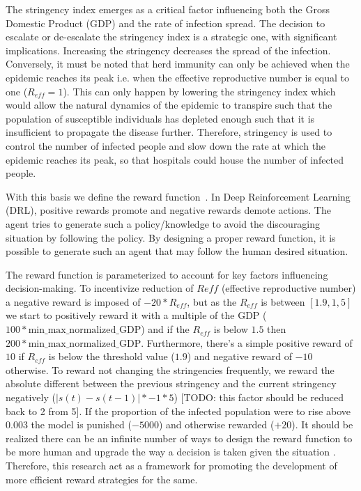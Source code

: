 \documentclass[tikz,fleqn,12pt]{wlscirep}
\begin{document}
The stringency index emerges as a critical factor influencing both the Gross Domestic Product (GDP) and the rate of infection spread. The decision to escalate or de-escalate the stringency index is a strategic one, with significant implications. Increasing the stringency decreases the spread of the infection. Conversely, it must be noted that herd immunity can only be achieved when the epidemic reaches its peak i.e. when the effective reproductive number is equal to one ($R_{eff} = 1$). This can only happen by lowering the stringency index which would allow the natural dynamics of the epidemic to transpire such that the population of susceptible individuals has depleted enough such that it is insufficient to propagate the disease further. Therefore, stringency is used to control the number of infected people and slow down the rate at which the epidemic reaches its peak, so that hospitals could house the number of infected people.

With this basis we define the reward function~\cite{Ohi2020}. In Deep Reinforcement Learning (DRL), positive rewards promote and negative rewards demote actions. The agent tries to generate such a policy/knowledge to avoid the discouraging situation by following the policy. By designing a proper reward function, it is possible to generate such an agent that may follow the human desired situation.

The reward function is parameterized to account for key factors influencing decision-making. To incentivize reduction of $R{eff}$ (effective reproductive number) a negative reward is imposed of $-20 * R_{eff}$, but as the $R_{eff}$ is between $[1.9, 1,5]$ we start to positively reward it with a multiple of the GDP ($100 * \textrm{min\_max\_normalized\_GDP}$) and if the $R_{eff}$ is below $1.5$ then $200 * \textrm{min\_max\_normalized\_GDP}$. Furthermore, there's a simple positive reward of $10$ if $R_{eff}$ is below the threshold value ($1.9$) and negative reward of $-10$ otherwise. To reward not changing the stringencies frequently, we reward the absolute different between the previous stringency and the current stringency negatively ($|s(t) - s(t-1)| * -1 * 5$) [TODO: this factor should be reduced back to 2 from 5]. If the proportion of the infected population were to rise above 0.003 the model is punished ($-5000$) and otherwise rewarded ($+20$). It should be realized there can be an infinite number of ways to design the reward function to be more human and upgrade the way a decision is taken given the situation \cite{AWSDeepRacer}. Therefore, this research act as a  framework for promoting the development of more efficient reward strategies for the same. 
\end{document}
